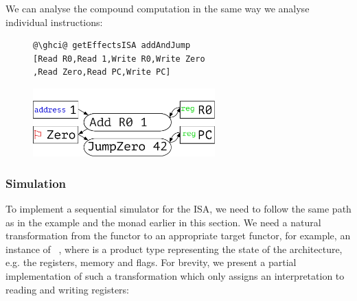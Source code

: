 \noindent
We can analyse the compound computation in the same way we analyse individual
instructions:

\vspace{-3mm}
\begin{figure}[!h]
 \begin{minipage}{0.45\textwidth}
\raggedleft
\begin{verbatim}
@\ghci@ getEffectsISA addAndJump
[Read R0,Read 1,Write R0,Write Zero
,Read Zero,Read PC,Write PC]
\end{verbatim}
 \end{minipage}
 \begin{minipage}{0.45\textwidth}
  \centering
\includegraphics[width=7cm]{./fig/addAndJump.pdf}
 \end{minipage}
\end{figure}


\subsubsection{Simulation}

To implement a sequential simulator for the ISA, we need to follow the same path
as in the  example and the  monad earlier in this section.
We need a natural transformation from the functor  to an appropriate
target functor, for example, an instance of ~,
where  is a product type representing the state of the
architecture, e.g. the registers, memory and flags. For brevity, we present a
partial implementation of such a transformation which only assigns an
interpretation to reading and writing registers:

